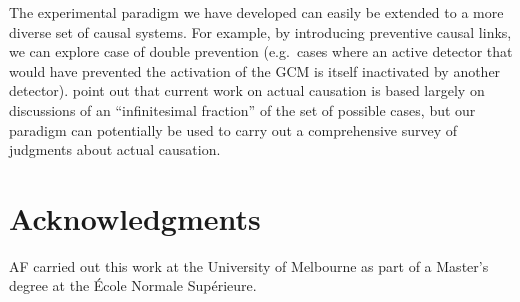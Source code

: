 \documentclass[10pt,letterpaper]{article}
\begin{document}

The experimental paradigm we have developed can easily be extended to a more diverse set of causal systems. For example, by introducing preventive causal links, we can explore case of double prevention (e.g.\ cases where an active detector that would have prevented the activation of the GCM is itself inactivated by another detector).  point out that current work on actual causation is based largely on discussions of an ``infinitesimal fraction'' of the set of possible cases, but our paradigm can potentially be used to carry out a comprehensive survey of judgments about actual causation.


\section{Acknowledgments}

AF carried out this work at the University of Melbourne as part of a Master's degree at the \'{E}cole Normale Sup\'{e}rieure. 


\setlength{\bibleftmargin}{.125in}
\setlength{\bibindent}{-\bibleftmargin}

\balance

\end{document}
